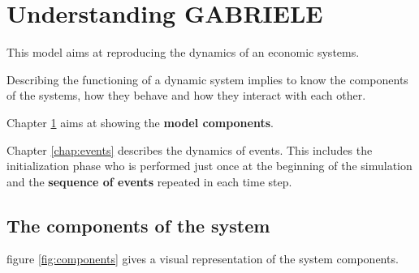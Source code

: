 \documentclass{book}
\begin{document}
\part{Understanding GABRIELE}

This model aims at reproducing the dynamics of an economic systems.

Describing the functioning of a dynamic system implies to know the components of the systems, how they behave and how they interact with each other. 


Chapter \ref{chap:components} aims at showing the \textbf{model components}.


Chapter \ref{chap:events} describes the dynamics of events. This includes the initialization phase who is performed just once at the beginning of the simulation and the \textbf{sequence of events} repeated in each time step.





\newpage

\chapter{The components of the system}\label{chap:components}

figure \ref{fig:components} gives a visual representation of the system components.
\end{document}
